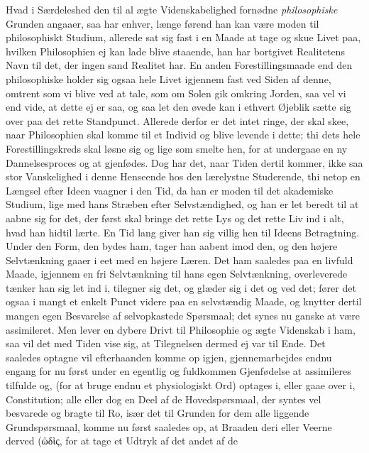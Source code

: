 \documentclass[12pt,a4paper]{book}
\newcommand{\apage}[1]{\marginnote{\footnotesize\textit{[#1]}}}
\begin{document}
Hvad i Særdeleshed den til al ægte Videnskabelighed fornødne \emph{philosophiske} Grunden
angaaer, saa har enhver, længe førend han kan  \apage{185} være moden til philosophiskt
Studium, allerede sat sig fast i en Maade at tage og skue Livet paa, hvilken
Philosophien ej kan lade blive staaende, han har bortgivet Realitetens Navn til
det, der ingen sand Realitet har. En anden Forestillingsmaade end den
philosophiske holder sig ogsaa hele Livet igjennem fast ved Siden af denne,
omtrent som vi blive ved at tale, som om Solen gik omkring Jorden, saa vel vi end
vide, at dette ej er saa, og saa let den øvede kan i ethvert Øjeblik sætte sig over
paa det rette Standpunct. Allerede derfor er det intet ringe, der skal skee, naar
Philosophien skal komme til et Individ og blive levende i dette; thi dets hele
Forestillingskreds skal løsne sig og lige som smelte hen, for at undergaae en ny
Dannelsesproces og at gjenfødes. Dog har det, naar Tiden dertil kommer, ikke saa
stor Vanskelighed i denne Henseende hos den lærelystne Studerende, thi netop en
Længsel efter Ideen vaagner i den Tid, da han er moden til det akademiske Studium,
lige med hans Stræben efter Selvstændighed, og han er let beredt til at aabne sig
for det, der først skal bringe det rette Lys og det rette Liv ind i alt, hvad han
hidtil lærte. En Tid lang giver han sig villig hen til Ideens Betragtning. Under
den Form, den bydes ham, tager han aabent imod den, og den højere Selvtænkning
gaaer i eet med en højere Læren. Det ham saaledes paa en \apage{186} livfuld Maade, igjennem
en fri Selvtænkning til hans egen Selvtænkning, overleverede tænker han sig let
ind i, tilegner sig det, og glæder sig i det og ved det; fører det ogsaa i mangt
et enkelt Punct videre paa en selvstændig Maade, og knytter dertil mangen egen
Besvarelse af selvopkastede Spørsmaal; det synes nu ganske at være assimileret.
Men lever en dybere Drivt til Philosophie og ægte Videnskab i ham, saa vil det med
Tiden vise sig, at Tilegnelsen dermed ej var til Ende. Det saaledes optagne vil
efterhaanden komme op igjen, gjennemarbejdes endnu engang for nu først under en
egentlig og fuldkommen Gjenfødelse at assimileres tilfulde og, (for at bruge endnu
et physiologiskt Ord) optages i, eller gaae over i, Constitution; alle eller dog en
Deel af de Hovedspørsmaal, der syntes vel besvarede og bragte til Ro, især det til
Grunden for dem alle liggende Grundspørsmaal, komme nu først saaledes op, at
Braaden deri eller Veerne derved (ὠδὶς, for at tage et Udtryk af det andet af de
\end{document}
